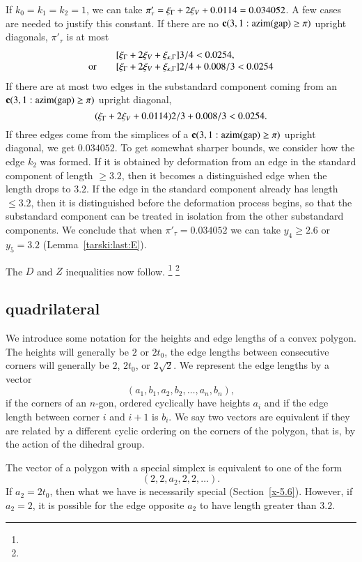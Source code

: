 If $k_0=k_1=k_2=1$, we can take $\pi'_\tau=
\xi_\Gamma+2\xi_V+0.0114=0.034052$. A few cases are needed to justify
this constant. If there are no ${\operatorname{\bf c}}{(3,1: {\operatorname{azim}}({\operatorname{gap}}) \ge \pi)}$ upright diagonals,
$\pi'_\tau$ is at most
    $$
    \begin{array}{lll}
    &[\xi_\Gamma + 2 \xi_V +\xi_{\kappa,\Gamma} ]3/4 < 0.0254,\\
    \hbox{or\quad }&[\xi_\Gamma+2\xi_V+\xi_{\kappa,\Gamma}]2/4 + 0.008/3 < 0.0254
    \end{array}
    $$
If there are at most two edges in the substandard component coming from an
${\operatorname{\bf c}}{(3,1: {\operatorname{azim}}({\operatorname{gap}}) \ge \pi)}$ upright diagonal,
    $$(\xi_\Gamma+2\xi_V+0.0114)2/3 + 0.008/3 < 0.0254.$$
If three edges come from the simplices of a ${\operatorname{\bf c}}{(3,1: {\operatorname{azim}}({\operatorname{gap}}) \ge \pi)}$ upright
diagonal, we get $0.034052$. To get somewhat sharper bounds, we
consider how the edge $k_2$ was formed.  If it is obtained by
deformation from an edge in the standard component of length
$\ge3.2$, then it becomes a distinguished edge when the length
drops to $3.2$.  If the edge in the standard component already has
length $\le3.2$, then it is distinguished before the deformation
process begins, so that the substandard component can be treated in isolation
from the other substandard components. We conclude that when
$\pi'_\tau=0.034052$ we can take $y_4\ge2.6$ or $y_5=3.2$
(Lemma~\ref{tarski:last:E}).

The $D$ and $Z$ inequalities now follow.%
\footnote{} %
\footnote{} %

\subsection{quadrilateral} %

We introduce some notation for the heights and edge lengths of a convex
polygon.  The heights will generally be $2$ or $2t_0$, the edge lengths
between consecutive corners will generally be $2$, $2t_0$, or
$2\sqrt{2}$.  We represent the edge lengths by a vector
    $$(a_1,b_1,a_2,b_2,\ldots,a_n,b_n),$$
if the corners of an $n$-gon, ordered cyclically have heights $a_i$ and
if the edge length between corner $i$ and $i+1$ is $b_i$.  We say two
vectors are equivalent if they are related by a different cyclic
ordering on the corners of the polygon, that is, by the action of the
dihedral group.

The vector of a polygon with a special simplex is equivalent to one of
the form
    $$(2,2,a_2,2,2,\ldots).$$  If $a_2=2t_0$, then what we have is
necessarily special (Section~\ref{x-5.6}). However, if $a_2=2$, it is
possible for the edge opposite $a_2$ to have length greater than $3.2$.


